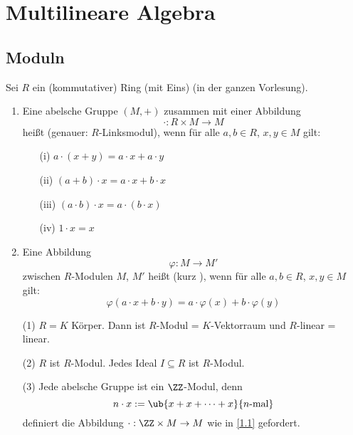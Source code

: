 \chapter{Multilineare Algebra}

\section{Moduln}

Sei $R$ ein (kommutativer) Ring (mit Eins) (in der ganzen Vorlesung).

\begin{Def}
\label{1.1}
\begin{enumerate}
\item Eine abelsche Gruppe $(M,+)$ zusammen mit einer Abbildung
\[
\cdot : R \times M \to M
\]
heißt \emp{\RMod}\index{\RMod} (genauer:
$R$-Linksmodul), wenn für alle $a,b\in R$, $x,y\in M$ gilt:
\begin{enumerate}
\item[(i)] $a \cdot (x+y) = a \cdot x + a \cdot y$
\item[(ii)] $(a+b) \cdot x = a \cdot x + b \cdot x$
\item[(iii)] $(a \cdot b) \cdot x = a \cdot (b \cdot x)$
\item[(iv)] $1 \cdot x = x$
\end{enumerate}
\item Eine Abbildung 
\[
\varphi: M \to M'
\]
zwischen $R$-Modulen $M$, $M'$
heißt \emp{\RModHom} (kurz
), wenn für alle $a,b \in R$, $x,y \in M$
gilt:
\[
\varphi (a \cdot x + b \cdot y) = a \cdot \varphi (x) + b \cdot \varphi (y)
\]
\end{enumerate}
\end{Def}

\begin{nnBsp}
\begin{enumerate}
\item[(1)] $R = K$ Körper. Dann ist $R$-Modul = $K$-Vektorraum und $R$-linear =
linear.
\item[(2)] $R$ ist $R$-Modul. Jedes Ideal $I \subseteq R$ ist $R$-Modul.
\item[(3)] Jede abelsche Gruppe ist ein $\ZZ$-Modul, denn
\[
n \cdot x := \ub{x + x + \cdots + x}{n\text{-mal}}
\]
definiert die Abbildung $\cdot: \ZZ \times M \to M$ wie in \ref{1.1}
gefordert.
\end{enumerate}
\end{nnBsp}

